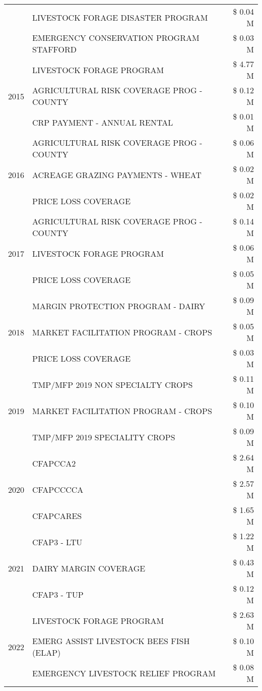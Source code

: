 \begin{tabular}{llr}
 & LIVESTOCK FORAGE DISASTER PROGRAM & \$ 0.04 M \\
 & EMERGENCY CONSERVATION PROGRAM STAFFORD & \$ 0.03 M \\
\cline{1-3}
\multirow[t]{3}{*}{2015} & LIVESTOCK FORAGE PROGRAM & \$ 4.77 M \\
 & AGRICULTURAL RISK COVERAGE PROG - COUNTY & \$ 0.12 M \\
 & CRP PAYMENT - ANNUAL RENTAL & \$ 0.01 M \\
\cline{1-3}
\multirow[t]{3}{*}{2016} & AGRICULTURAL RISK COVERAGE PROG - COUNTY & \$ 0.06 M \\
 & ACREAGE GRAZING PAYMENTS - WHEAT & \$ 0.02 M \\
 & PRICE LOSS COVERAGE & \$ 0.02 M \\
\cline{1-3}
\multirow[t]{3}{*}{2017} & AGRICULTURAL RISK COVERAGE PROG - COUNTY & \$ 0.14 M \\
 & LIVESTOCK FORAGE PROGRAM & \$ 0.06 M \\
 & PRICE LOSS COVERAGE & \$ 0.05 M \\
\cline{1-3}
\multirow[t]{3}{*}{2018} & MARGIN PROTECTION PROGRAM - DAIRY & \$ 0.09 M \\
 & MARKET FACILITATION PROGRAM - CROPS & \$ 0.05 M \\
 & PRICE LOSS COVERAGE & \$ 0.03 M \\
\cline{1-3}
\multirow[t]{3}{*}{2019} & TMP/MFP 2019 NON SPECIALTY CROPS & \$ 0.11 M \\
 & MARKET FACILITATION PROGRAM - CROPS & \$ 0.10 M \\
 & TMP/MFP 2019 SPECIALITY CROPS & \$ 0.09 M \\
\cline{1-3}
\multirow[t]{3}{*}{2020} & CFAPCCA2 & \$ 2.64 M \\
 & CFAPCCCCA & \$ 2.57 M \\
 & CFAPCARES & \$ 1.65 M \\
\cline{1-3}
\multirow[t]{3}{*}{2021} & CFAP3 - LTU & \$ 1.22 M \\
 & DAIRY MARGIN COVERAGE & \$ 0.43 M \\
 & CFAP3 - TUP & \$ 0.12 M \\
\cline{1-3}
\multirow[t]{3}{*}{2022} & LIVESTOCK FORAGE PROGRAM & \$ 2.63 M \\
 & EMERG ASSIST LIVESTOCK BEES FISH (ELAP) & \$ 0.10 M \\
 & EMERGENCY LIVESTOCK RELIEF PROGRAM & \$ 0.08 M \\
\cline{1-3}
\bottomrule
\end{tabular}
